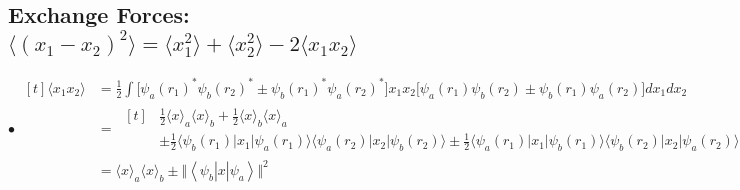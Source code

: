 \documentclass[12pt]{article}
\begin{document}
\subsection{Exchange Forces: \hspace{18pt} \(\Big\langle (x_1 - x_2)^2 \Big\rangle 
    = \langle x_1^2 \rangle + \langle x_2^2 \rangle 
    - 2 \langle x_1 x_2 \rangle\)}

\vspace{5pt}
\hspace{.5cm} 

\vspace{10pt} \noindent
\(\bullet \ \begin{aligned}[t]
    \langle x_1 x_2 \rangle &= \frac{1}{2} \int \Big[ \psi_a(r_1)^* \psi_b(r_2)^* 
        \pm \psi_b(r_1)^* \psi_a(r_2)^* \Big] x_1 x_2 \Big[ \psi_a(r_1) \psi_b(r_2) 
        \pm \psi_b(r_1) \psi_a(r_2) \Big] dx_1 dx_2\\[5pt]
    &= \ \begin{aligned}[t]
            &   \frac{1}{2} \langle x \rangle_a \langle x \rangle_b +
                \frac{1}{2} \langle x \rangle_b \langle x \rangle_a \\[5pt]
            &\pm \frac{1}{2} \Big\langle \psi_b(r_1) \Big| x_1 \Big| \psi_a(r_1) \Big\rangle 
                \Big\langle \psi_a(r_2) \Big| x_2 \Big| \psi_b(r_2) \Big\rangle \pm \frac{1}{2} 
                \Big\langle \psi_a(r_1) \Big| x_1 \Big| \psi_b(r_1) \Big\rangle
                \Big\langle \psi_b(r_2) \Big| x_2 \Big| \psi_a(r_2) \Big\rangle
        \end{aligned}\\[10pt]
    &= \langle x \rangle_a \langle x \rangle_b \pm
    \big\Vert \left\langle \psi_b \right| x \left| \psi_a \right\rangle \big\Vert^2
\end{aligned}\)
\end{document}

